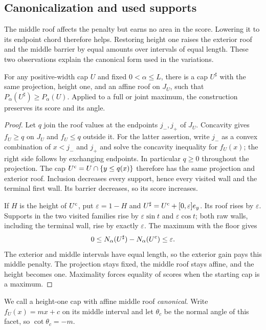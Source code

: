 \subsection{Canonicalization and used supports}

The middle roof affects the penalty but earns no area in the score.
Lowering it to its endpoint chord therefore helps. Restoring height
one raises the exterior roof and the middle barrier by equal amounts
over intervals of equal length. These two observations explain the
canonical form used in the variations.

\begin{lemma}\label{lem:selection-canonical}
For any positive-width cap $U$ and fixed $0<\alpha\le L$, there
is a cap $U^\sharp$ with the same projection, height one, and an
affine roof on $J_U$, such that $P_\alpha(U^\sharp)\ge P_\alpha(U)$.
Applied to a full or joint maximum, the construction preserves its
score and its angle.
\end{lemma}

\begin{proof}
Let $q$ join the roof values at the endpoints $j_-,j_+$ of $J_U$.
Concavity gives $f_U\ge q$ on $J_U$ and $f_U\le q$ outside it.
For the latter assertion, write $j_-$ as a convex combination of
$x<j_-$ and $j_+$ and solve the concavity inequality for $f_U(x)$;
the right side follows by exchanging endpoints. In particular
$q\ge0$ throughout the projection.
The cap $U^{\rm c}=U\cap\{y\le q(x)\}$ therefore has the same
projection and exterior roof. Inclusion decreases every support,
hence every visited wall and the terminal first wall. Its barrier
decreases, so its score increases.

If $H$ is the height of $U^{\rm c}$, put $\varepsilon=1-H$ and
$U^\sharp=U^{\rm c}+[0,\varepsilon]e_y$.
Its roof rises by $\varepsilon$. Supports in the two visited
families rise by $\varepsilon\sin t$ and $\varepsilon\cos t$;
both raw walls, including the terminal wall, rise by exactly
$\varepsilon$. The maximum with the floor gives
\[
 0\le N_\alpha(U^\sharp)-N_\alpha(U^{\rm c})\le\varepsilon.
\]
The exterior and middle intervals have equal length, so the exterior
gain pays this middle penalty. The projection stays fixed, the
middle roof stays affine, and the height becomes one. Maximality
forces equality of scores when the starting cap is a maximum.
\end{proof}

We call a height-one cap with affine middle roof \emph{canonical}.
Write $f_U(x)=mx+c$ on its middle interval and let $\theta_c$ be
the normal angle of this facet, so $\cot\theta_c=-m$.

